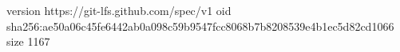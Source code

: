 version https://git-lfs.github.com/spec/v1
oid sha256:ae50a06c45fe6442ab0a098c59b9547fcc8068b7b8208539e4b1ec5d82cd1066
size 1167
